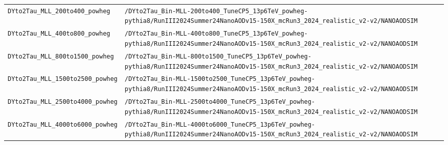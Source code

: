 \begin{longtable}{@{}>{\RaggedRight\arraybackslash}p{} >{\RaggedRight\arraybackslash}p{}@{}}
\addlinespace[2pt]
\texttt{DYto2Tau\_\allowbreak{}MLL\_\allowbreak{}200to400\_\allowbreak{}powheg} & \texttt{/\allowbreak{}DYto2Tau\_\allowbreak{}Bin-\allowbreak{}MLL-\allowbreak{}200to400\_\allowbreak{}TuneCP5\_\allowbreak{}13p6TeV\_\allowbreak{}powheg-\allowbreak{}pythia8/\allowbreak{}RunIII2024Summer24NanoAODv15-\allowbreak{}150X\_\allowbreak{}mcRun3\_\allowbreak{}2024\_\allowbreak{}realistic\_\allowbreak{}v2-\allowbreak{}v2/\allowbreak{}NANOAODSIM} \\
\addlinespace[2pt]
\texttt{DYto2Tau\_\allowbreak{}MLL\_\allowbreak{}400to800\_\allowbreak{}powheg} & \texttt{/\allowbreak{}DYto2Tau\_\allowbreak{}Bin-\allowbreak{}MLL-\allowbreak{}400to800\_\allowbreak{}TuneCP5\_\allowbreak{}13p6TeV\_\allowbreak{}powheg-\allowbreak{}pythia8/\allowbreak{}RunIII2024Summer24NanoAODv15-\allowbreak{}150X\_\allowbreak{}mcRun3\_\allowbreak{}2024\_\allowbreak{}realistic\_\allowbreak{}v2-\allowbreak{}v2/\allowbreak{}NANOAODSIM} \\
\addlinespace[2pt]
\texttt{DYto2Tau\_\allowbreak{}MLL\_\allowbreak{}800to1500\_\allowbreak{}powheg} & \texttt{/\allowbreak{}DYto2Tau\_\allowbreak{}Bin-\allowbreak{}MLL-\allowbreak{}800to1500\_\allowbreak{}TuneCP5\_\allowbreak{}13p6TeV\_\allowbreak{}powheg-\allowbreak{}pythia8/\allowbreak{}RunIII2024Summer24NanoAODv15-\allowbreak{}150X\_\allowbreak{}mcRun3\_\allowbreak{}2024\_\allowbreak{}realistic\_\allowbreak{}v2-\allowbreak{}v2/\allowbreak{}NANOAODSIM} \\
\addlinespace[2pt]
\texttt{DYto2Tau\_\allowbreak{}MLL\_\allowbreak{}1500to2500\_\allowbreak{}powheg} & \texttt{/\allowbreak{}DYto2Tau\_\allowbreak{}Bin-\allowbreak{}MLL-\allowbreak{}1500to2500\_\allowbreak{}TuneCP5\_\allowbreak{}13p6TeV\_\allowbreak{}powheg-\allowbreak{}pythia8/\allowbreak{}RunIII2024Summer24NanoAODv15-\allowbreak{}150X\_\allowbreak{}mcRun3\_\allowbreak{}2024\_\allowbreak{}realistic\_\allowbreak{}v2-\allowbreak{}v2/\allowbreak{}NANOAODSIM} \\
\addlinespace[2pt]
\texttt{DYto2Tau\_\allowbreak{}MLL\_\allowbreak{}2500to4000\_\allowbreak{}powheg} & \texttt{/\allowbreak{}DYto2Tau\_\allowbreak{}Bin-\allowbreak{}MLL-\allowbreak{}2500to4000\_\allowbreak{}TuneCP5\_\allowbreak{}13p6TeV\_\allowbreak{}powheg-\allowbreak{}pythia8/\allowbreak{}RunIII2024Summer24NanoAODv15-\allowbreak{}150X\_\allowbreak{}mcRun3\_\allowbreak{}2024\_\allowbreak{}realistic\_\allowbreak{}v2-\allowbreak{}v2/\allowbreak{}NANOAODSIM} \\
\addlinespace[2pt]
\texttt{DYto2Tau\_\allowbreak{}MLL\_\allowbreak{}4000to6000\_\allowbreak{}powheg} & \texttt{/\allowbreak{}DYto2Tau\_\allowbreak{}Bin-\allowbreak{}MLL-\allowbreak{}4000to6000\_\allowbreak{}TuneCP5\_\allowbreak{}13p6TeV\_\allowbreak{}powheg-\allowbreak{}pythia8/\allowbreak{}RunIII2024Summer24NanoAODv15-\allowbreak{}150X\_\allowbreak{}mcRun3\_\allowbreak{}2024\_\allowbreak{}realistic\_\allowbreak{}v2-\allowbreak{}v2/\allowbreak{}NANOAODSIM} \\

\end{longtable}
